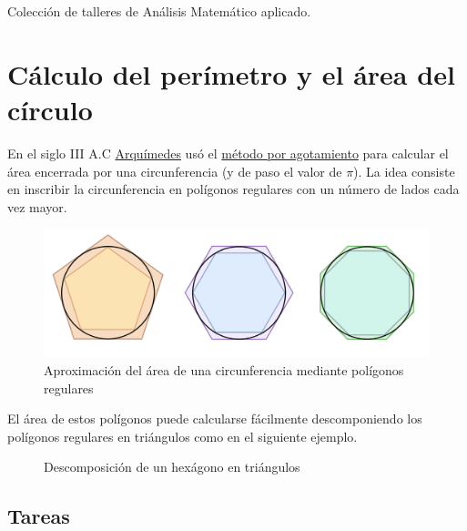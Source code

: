 \documentclass[
  a4paper,
]{scrreport}
\begin{document}

Colección de talleres de Análisis Matemático aplicado.


\chapter{Cálculo del perímetro y el área del
círculo}\label{cuxe1lculo-del-peruxedmetro-y-el-uxe1rea-del-cuxedrculo}

En el siglo III A.C
\href{https://es.wikipedia.org/wiki/Arqu\%C3\%ADmedes}{Arquímedes} usó
el
\href{https://es.wikipedia.org/wiki/M\%C3\%A9todo_por_agotamiento}{método
por agotamiento} para calcular el área encerrada por una circunferencia
(y de paso el valor de \(\pi\)). La idea consiste en inscribir la
circunferencia en polígonos regulares con un número de lados cada vez
mayor.

\begin{figure}[H]

{\centering \includegraphics{img/area-circulo/poligonos-circunferencia.png}

}

\caption{Aproximación del área de una circunferencia mediante polígonos
regulares}

\end{figure}%

El área de estos polígonos puede calcularse fácilmente descomponiendo
los polígonos regulares en triángulos como en el siguiente ejemplo.

\begin{figure}
\centering

\caption{Descomposición de un hexágono en triángulos}
\end{figure}

\section{Tareas}\label{tareas}
\end{document}

